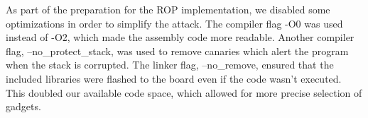 
As part of the preparation for the ROP implementation, we disabled some  optimizations in order to simplify the attack. The compiler flag -O0 was used instead of -O2, which made the assembly code more readable. Another compiler flag, --no\_protect\_stack, was used to remove canaries which alert the program when the stack is corrupted. The linker flag, --no\_remove, ensured that the included libraries were flashed to the board even if the code wasn't executed. This doubled our available code space, which allowed for more precise selection of gadgets. 